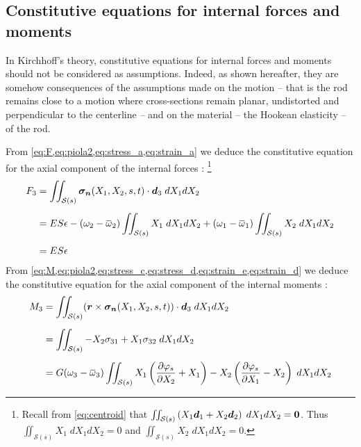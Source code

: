 \subsection{Constitutive equations for internal forces and moments}
In Kirchhoff's theory, constitutive equations for internal forces and moments should not be considered as assumptions. Indeed, as shown hereafter, they are somehow consequences of the assumptions made on the motion -- that is the rod remains close to a motion where cross-sections remain planar, undistorted and perpendicular to the centerline -- and on the material -- the Hookean elasticity -- of the rod.

From \cref{eq:F,eq:piola2,eq:stress_a,eq:strain_a} we deduce the constitutive equation for the axial component of the internal forces : \footnote{Recall from \cref{eq:centroid} that $\iint_{\mathcal{S}(s)} \left(X_1\boldsymbol{d}_1 + X_2\boldsymbol{d}_2\right) \;dX_1 dX_2 = \boldsymbol{0}$. Thus $\iint_{\mathcal{S}(s)} {X_1} \;dX_1 dX_2 = 0$ and $\iint_{\mathcal{S}(s)} {X_2} \;dX_1 dX_2 = 0$.}
\begin{equation}
	\begin{aligned}
		F_3 &= \iint_{\mathcal{S}(s)} \vect{\sigma_n}(X_1, X_2, s, t) \cdot \vect{d}_3 \;dX_1 dX_2 
		\\[0.5em]
		&= ES\epsilon 
		- (\omega_2 - \overbar{\omega}_2) \iint_{\mathcal{S}(s)} {X_1} \;dX_1 dX_2
		+ (\omega_1 - \overbar{\omega}_1) \iint_{\mathcal{S}(s)} {X_2} \;dX_1 dX_2
		\\[0.5em]
		&= ES\epsilon
	\end{aligned}
\end{equation}
From \cref{eq:M,eq:piola2,eq:stress_c,eq:stress_d,eq:strain_e,eq:strain_d} we deduce the constitutive equation for the axial component of the internal moments : 
\begin{equation}
	\begin{aligned}
		M_3 &= \iint_{\mathcal{S}(s)} (\vect{r} \times \vect{\sigma_n}(X_1, X_2, s, t)) \cdot \vect{d}_3 \;dX_1 dX_2
		\\[0.5em]
		&= \iint_{\mathcal{S}(s)} -X_2\sigma_{31} + X_1\sigma_{32}  \;dX_1 dX_2 
		\\[0.5em]
		&= G (\omega_3 - \overbar{\omega}_3) 
		\iint_{\mathcal{S}(s)} X_1 \left( \frac{\partial \varphi_s}{\partial {X_2}} + X_1 \right ) - X_2 \left( \frac{\partial \varphi_s}{\partial {X_1}}  - X_2 \right )
		 \;dX_1 dX_2 
	\end{aligned}
\end{equation}
